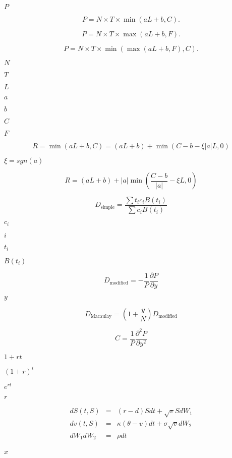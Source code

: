 \documentclass{article}
\begin{document}
$ P $
\pagebreak

\[ P = N \times T \times \min(a L + b, C). \]
\pagebreak

\[ P = N \times T \times \max(a L + b, F). \]
\pagebreak

\[ P = N \times T \times \min(\max(a L + b, F), C). \]
\pagebreak

$ N $
\pagebreak

$ T $
\pagebreak

$ L $
\pagebreak

$ a $
\pagebreak

$ b $
\pagebreak

$ C $
\pagebreak

$ F $
\pagebreak

\[R = \min(a L + b, C) = (a L + b) + \min(C - b - \xi |a| L, 0)
\]
\pagebreak

$ \xi = sgn(a) $
\pagebreak

\[R = (a L + b) + |a| \min(\frac{C - b}{|a|} - \xi L, 0)
\]
\pagebreak

\[D_{\mathrm{simple}} = \frac{\sum t_i c_i B(t_i)}{\sum c_i B(t_i)}
\]
\pagebreak

$ c_i $
\pagebreak

$ i $
\pagebreak

$ t_i $
\pagebreak

$ B(t_i) $
\pagebreak

\[D_{\mathrm{modified}} = -\frac{1}{P} \frac{\partial P}{\partial y}
\]
\pagebreak

$ y $
\pagebreak

\[D_{\mathrm{Macaulay}} = \left( 1 + \frac{y}{N} \right)
                        D_{\mathrm{modified}}
\]
\pagebreak

\[C = \frac{1}{P} \frac{\partial^2 P}{\partial y^2}
\]
\pagebreak

$ 1+rt $
\pagebreak

$ (1+r)^t $
\pagebreak

$ e^{rt} $
\pagebreak

$ r $
\pagebreak

\[\begin{array}{rcl}
dS(t, S)  &=& (r-d) S dt +\sqrt{v} S dW_1 \\
dv(t, S)  &=& \kappa (\theta - v) dt + \sigma \sqrt{v} dW_2 \\
dW_1 dW_2 &=& \rho dt \\
\end{array}
\]
\pagebreak

$ x $
\pagebreak
\end{document}
